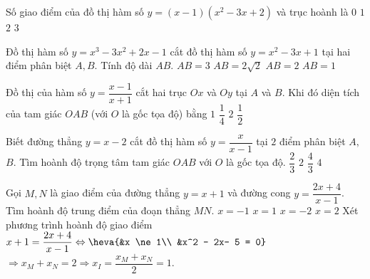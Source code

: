 \begin{ex}%
Số giao điểm của đồ thị hàm số $y=(x-1)(x^2-3x+2)$ và trục hoành là
\choice
{$0$}
{$1$}
{\True $2$}
{$3$}
\end{ex}
\begin{ex}
Đồ thị hàm số $y=x^3-3x^2+2x-1$ cắt đồ thị hàm số $y=x^2-3x+1$ tại hai điểm phân biệt $A,B$. Tính độ dài $AB$.
\choice
{$AB=3$}
{$AB=2\sqrt2$}
{$AB=2$}
{\True $AB=1$}
\end{ex}
\begin{ex}
Đồ thị của hàm số $ y = \dfrac{x - 1}{x+1} $ cắt hai trục $ Ox $ và $ Oy $ tại $ A $ và $ B $. Khi đó diện tích của tam giác $ OAB $ (với $ O $ là gốc tọa độ) bằng
\choice
{$ 1 $}
{$ \dfrac{1}{4} $}
{$ 2 $}
{\True $ \dfrac{1}{2} $}
\end{ex}
\begin{ex}
Biết đường thẳng $y=x-2$ cắt đồ thị hàm số $ y=\dfrac{x}{x-1} $ tại $ 2 $ điểm phân biệt $ A, $ $ B. $ Tìm hoành độ trọng tâm tam giác $OAB$ với $O$ là gốc tọa độ.
\choice
{$ \dfrac{2}{3} $}
{$ 2 $}
{\True $ \dfrac{4}{3} $}
{$ 4 $}
\end{ex}
\begin{ex}%
Gọi $ M, N $ là giao điểm của đường thẳng $ y = x + 1 $ và đường cong $ y = \dfrac{2x+4}{x-1} $. Tìm hoành độ trung điểm của đoạn thẳng $ MN. $
\choice
{$ x = -1 $}
{\True $ x = 1 $}
{$ x = -2 $}
{ $ x = 2$}
\loigiai
{Xét phương trình hoành độ giao điểm $ x+ 1 = \dfrac{2x +4}{x-1} \Leftrightarrow \heva{&x \ne 1\\ &x^2 - 2x- 5 = 0}$\\
    $ \Rightarrow x_M + x_N = 2 \Rightarrow x_I = \dfrac{x_M+x_N}{2} = 1.$}
\end{ex}
